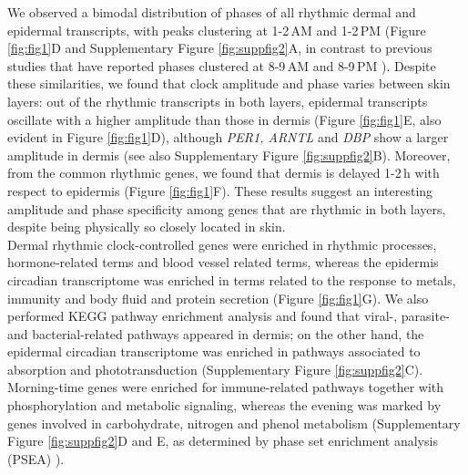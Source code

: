 {We observed a bimodal distribution of phases of all rhythmic dermal and epidermal transcripts, with peaks clustering at 1-2\,AM and 1-2\,PM (Figure \ref{fig:fig1}D and Supplementary Figure \ref{fig:suppfig2}A, in contrast to previous studies that have reported phases clustered at 8-9\,AM and 8-9\,PM \cite{Wu2018, Wu2020}). Despite these similarities, we found that clock amplitude and phase varies between skin layers: out of the rhythmic transcripts in both layers, epidermal transcripts oscillate with a higher amplitude than those in dermis (Figure \ref{fig:fig1}E, also evident in Figure \ref{fig:fig1}D), although \textit{PER1, ARNTL} and \textit{DBP} show a larger amplitude in dermis (see also Supplementary Figure \ref{fig:suppfig2}B). Moreover, from the common rhythmic genes, we found that dermis is delayed 1-2\,h with respect to epidermis (Figure \ref{fig:fig1}F). These results suggest an interesting amplitude and phase specificity among genes that are rhythmic in both layers, despite being physically so closely located in skin. \\

Dermal rhythmic clock-controlled genes were enriched in rhythmic processes, hormone-related terms and blood vessel related terms, whereas the epidermis circadian transcriptome was enriched in terms related to the response to metals, immunity and body fluid and protein secretion (Figure \ref{fig:fig1}G). We also performed KEGG pathway enrichment analysis and found that viral-, parasite- and bacterial-related pathways appeared in dermis; on the other hand, the epidermal circadian transcriptome was enriched in pathways associated to absorption and phototransduction (Supplementary Figure \ref{fig:suppfig2}C). Morning-time genes were enriched for immune-related pathways together with phosphorylation and metabolic signaling, whereas the evening was marked by genes involved in carbohydrate, nitrogen and phenol metabolism (Supplementary Figure \ref{fig:suppfig2}D and E, as determined by phase set enrichment analysis (PSEA) \cite{Zhang2016}). %


}
